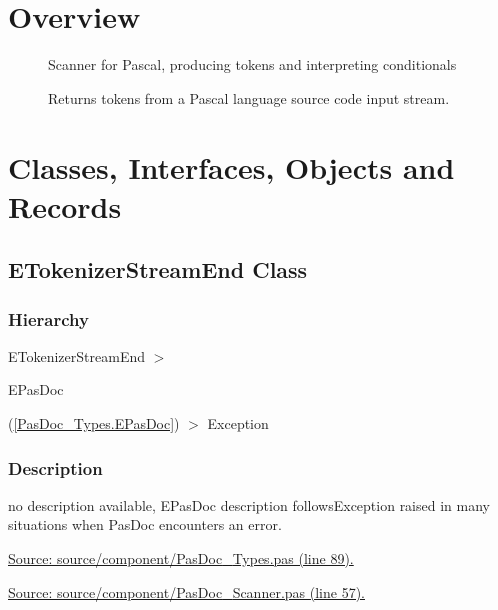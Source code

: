 \documentclass{report}
\newif\ifpdf
\begin{document}
\section{Overview}
\begin{description}
\item[\texttt{\begin{ttfamily}ETokenizerStreamEnd\end{ttfamily} Class}]
\item[\texttt{\begin{ttfamily}EInvalidIfCondition\end{ttfamily} Class}]
\item[\texttt{\begin{ttfamily}TScanner\end{ttfamily} Class}]Scanner for Pascal, producing tokens and interpreting conditionals

Returns tokens from a Pascal language source code input stream.
\end{description}
\section{Classes, Interfaces, Objects and Records}
\ifpdf
\subsection*{\large{\textbf{ETokenizerStreamEnd Class}}\normalsize\hspace{1ex}\hrulefill}
\else
\subsection*{ETokenizerStreamEnd Class}
\fi
\label{PasDoc_Scanner.ETokenizerStreamEnd}
\subsubsection*{\large{\textbf{Hierarchy}}\normalsize\hspace{1ex}\hfill}
ETokenizerStreamEnd {$>$} \begin{ttfamily}EPasDoc\end{ttfamily}(\ref{PasDoc_Types.EPasDoc}) {$>$} 
Exception
\subsubsection*{\large{\textbf{Description}}\normalsize\hspace{1ex}\hfill}
no description available, EPasDoc description followsException raised in many situations when PasDoc encounters an error.\par
\href{https://github.com/pasdoc/pasdoc/blob/master/source/component/PasDoc_Types.pas#L89}{Source: source/component/PasDoc{\_}Types.pas (line 89).}\par
\href{https://github.com/pasdoc/pasdoc/blob/master/source/component/PasDoc_Scanner.pas#L57}{Source: source/component/PasDoc{\_}Scanner.pas (line 57).}\ifpdf
\end{document}
